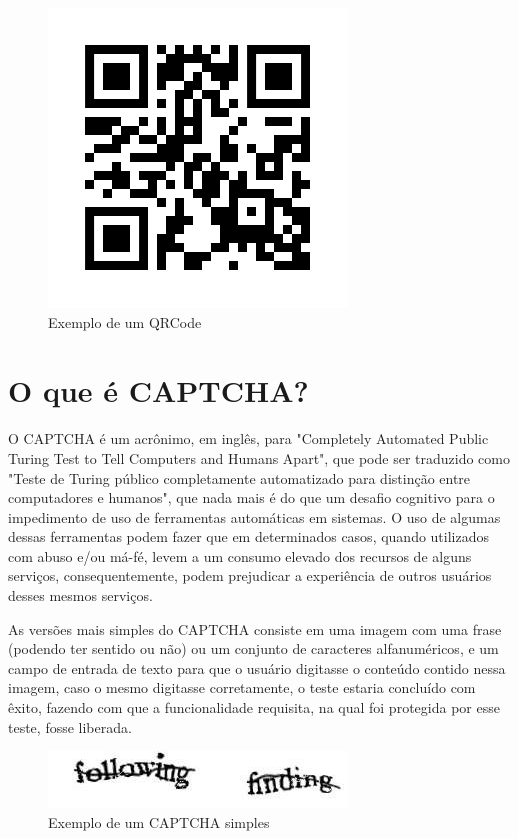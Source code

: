 \begin{figure}[h]
    \centering
    \includegraphics[scale=0.5]{tcc/figures/exemplo-qrcode.png}
    \caption{Exemplo de um QRCode}
    \label{fig-exemplo-qrcode}
\end{figure}

\section{O que é CAPTCHA?}

O CAPTCHA é um acrônimo, em inglês, para "Completely Automated Public Turing Test to Tell Computers and Humans Apart", que pode ser traduzido como "Teste de Turing público completamente automatizado para distinção entre computadores e humanos", que nada mais é do que um desafio cognitivo para o impedimento de uso de ferramentas automáticas em sistemas. O uso de algumas dessas ferramentas podem fazer que em determinados casos, quando utilizados com abuso e/ou má-fé, levem a um consumo elevado dos recursos de alguns serviços, consequentemente, podem prejudicar a experiência de outros usuários desses mesmos serviços.

As versões mais simples do CAPTCHA consiste em uma imagem com uma frase (podendo ter sentido ou não) ou um conjunto de caracteres alfanuméricos, e um campo de entrada de texto para que o usuário digitasse o conteúdo contido nessa imagem, caso o mesmo digitasse corretamente, o teste estaria concluído com êxito, fazendo com que a funcionalidade requisita, na qual foi protegida por esse teste, fosse liberada.

\begin{figure}[h]
    \centering
    \includegraphics[scale=0.5]{tcc/figures/captcha/captcha-frase.jpg}
    \caption{Exemplo de um CAPTCHA simples}
    \label{fig-exemplo-captcha-simples}
\end{figure}

